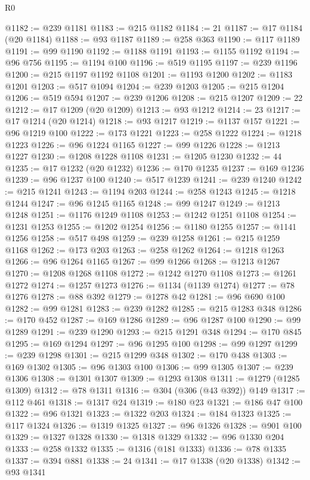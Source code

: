 \begin{lexlean}{R0}
\begin{coremodule}
@1182 := @239 @1181
@1183 := @215 @1182
@1184 := 21
@1187 := @17 @1184 (@20 @1184)
@1188 := @93 @1187
@1189 := @258 @363
@1190 := @117 @1189
@1191 := @99 @1190
@1192 := @1188 @1191
@1193 := @1155 @1192
@1194 := @96 @756
@1195 := @1194 @100
@1196 := @519 @1195
@1197 := @239 @1196
@1200 := @215 @1197 @1192 @1108
@1201 := @1193 @1200
@1202 := @1183 @1201
@1203 := @517 @1094
@1204 := @239 @1203
@1205 := @215 @1204
@1206 := @519 @594
@1207 := @239 @1206
@1208 := @215 @1207
@1209 := 22
@1212 := @17 @1209 (@20 @1209)
@1213 := @93 @1212
@1214 := 23
@1217 := @17 @1214 (@20 @1214)
@1218 := @93 @1217
@1219 := @1137 @157
@1221 := @96 @1219 @100
@1222 := @173 @1221
@1223 := @258 @1222
@1224 := @1218 @1223
@1226 := @96 @1224 @1165
@1227 := @99 @1226
@1228 := @1213 @1227
@1230 := @1208 @1228 @1108
@1231 := @1205 @1230
@1232 := 44
@1235 := @17 @1232 (@20 @1232)
@1236 := @170 @1235
@1237 := @169 @1236
@1239 := @96 @1237 @100
@1240 := @517 @1239
@1241 := @239 @1240
@1242 := @215 @1241
@1243 := @1194 @203
@1244 := @258 @1243
@1245 := @1218 @1244
@1247 := @96 @1245 @1165
@1248 := @99 @1247
@1249 := @1213 @1248
@1251 := @1176 @1249 @1108
@1253 := @1242 @1251 @1108
@1254 := @1231 @1253
@1255 := @1202 @1254
@1256 := @1180 @1255
@1257 := @1141 @1256
@1258 := @517 @498
@1259 := @239 @1258
@1261 := @215 @1259 @1168
@1262 := @173 @203
@1263 := @258 @1262
@1264 := @1218 @1263
@1266 := @96 @1264 @1165
@1267 := @99 @1266
@1268 := @1213 @1267
@1270 := @1208 @1268 @1108
@1272 := @1242 @1270 @1108
@1273 := @1261 @1272
@1274 := @1257 @1273
@1276 := @1134 (@1139 @1274)
@1277 := @78 @1276
@1278 := @88 @392
@1279 := @1278 @42
@1281 := @96 @690 @100
@1282 := @99 @1281
@1283 := @239 @1282
@1285 := @215 @1283 @348
@1286 := @170 @452
@1287 := @169 @1286
@1289 := @96 @1287 @100
@1290 := @99 @1289
@1291 := @239 @1290
@1293 := @215 @1291 @348
@1294 := @170 @845
@1295 := @169 @1294
@1297 := @96 @1295 @100
@1298 := @99 @1297
@1299 := @239 @1298
@1301 := @215 @1299 @348
@1302 := @170 @438
@1303 := @169 @1302
@1305 := @96 @1303 @100
@1306 := @99 @1305
@1307 := @239 @1306
@1308 := @1301 @1307
@1309 := @1293 @1308
@1311 := @1279 (@1285 @1309)
@1312 := @78 @1311
@1316 := @304 (@306 (@43 @392)) @149
@1317 := @112 @461
@1318 := @1317 @24
@1319 := @180 @23
@1321 := @186 @47 @100
@1322 := @96 @1321
@1323 := @1322 @203
@1324 := @184 @1323
@1325 := @117 @1324
@1326 := @1319 @1325
@1327 := @96 @1326
@1328 := @901 @100
@1329 := @1327 @1328
@1330 := @1318 @1329
@1332 := @96 @1330 @204
@1333 := @258 @1332
@1335 := @1316 (@181 @1333)
@1336 := @78 @1335
@1337 := @394 @881
@1338 := 24
@1341 := @17 @1338 (@20 @1338)
@1342 := @93 @1341

\end{coremodule}
\end{lexlean}
